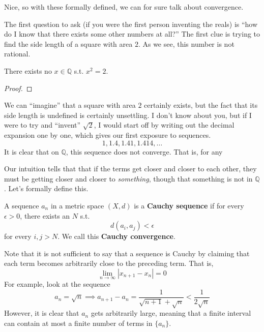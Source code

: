 \documentclass{article}
\begin{document}
      Nice, so with these formally defined, we can for sure talk about convergence. 

      The first question to ask (if you were the first person inventing the reals) is ``how do I know that there exists some other numbers at all?'' The first clue is trying to find the side length of a square with area $2$. As we see, this number is not rational. 

      \begin{theorem}
        There exists no $x \in \mathbb{Q}$ s.t. $x^2 = 2$. 
      \end{theorem}
      \begin{proof}
        
      \end{proof} 

      We can ``imagine'' that a square with area $2$ certainly exists, but the fact that its side length is undefined is certainly unsettling. I don't know about you, but if I were to try and ``invent'' $\sqrt{2}$, I would start off by writing out the decimal expansion one by one, which gives our first exposure to sequences. 
      \begin{equation}
        1, 1.4, 1.41, 1.414, \ldots
      \end{equation} 
      It is clear that on $\mathbb{Q}$, this sequence does not converge. That is, for any 

      Our intuition tells that that if the terms get closer and closer to each other, they must be getting closer and closer to \textit{something}, though that something is not in $\mathbb{Q}$. Let's formally define this. 

      \begin{definition}
        A sequence $a_n$ in a metric space $(X, d)$ is a \textbf{Cauchy sequence} if for every $\epsilon > 0$, there exists an $N$ s.t. 
        \begin{equation}
          d(a_i, a_j) < \epsilon
        \end{equation}
        for every $i, j > N$. We call this \textbf{Cauchy convergence}. 
      \end{definition}


      Note that it is not sufficient to say that a sequence is Cauchy by claiming that each term becomes arbitrarily close to the preceding term. That is, 
      \begin{equation}
        \lim_{n \rightarrow \infty} |x_{n+1} - x_{n}| = 0
      \end{equation}
      For example, look at the sequence 
      \begin{equation}
        a_n = \sqrt{n} \implies a_{n+1} - a_{n} = \frac{1}{\sqrt{n+1} + \sqrt{n}} < \frac{1}{2\sqrt{n}}
      \end{equation}
      However, it is clear that $a_n$ gets arbitrarily large, meaning that a finite interval can contain at most a finite number of terms in $\{a_n\}$. 
\end{document}
